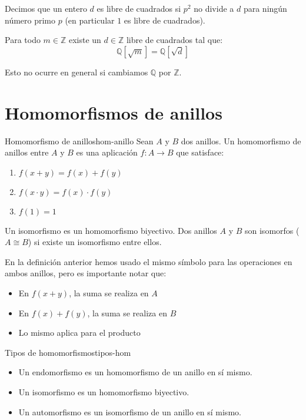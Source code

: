 \begin{example}{}{}
    Decimos que un entero \(d\) es libre de cuadrados si \(p^2\) no divide a \(d\) para ningún número primo \(p\) (en particular \(1\) es libre de cuadrados).
    
    Para todo \(m \in \mathbb{Z}\) existe un \(d \in \mathbb{Z}\) libre de cuadrados tal que:
    \[
    \mathbb{Q}[\sqrt{m}] = \mathbb{Q}[\sqrt{d}]
    \]
    
    Esto no ocurre en general si cambiamos \(\mathbb{Q}\) por \(\mathbb{Z}\).
\end{example}

\clearpage
\section{Homomorfismos de anillos}

\begin{definition}{Homomorfismo de anillos}{hom-anillo}
    Sean \(A\) y \(B\) dos anillos. Un homomorfismo de anillos entre \(A\) y \(B\) es una aplicación \(f: A \to B\) que satisface:
    \begin{enumerate}
        \item \(f(x + y) = f(x) + f(y)\)
        \item \(f(x \cdot y) = f(x) \cdot f(y)\)
        \item \(f(1) = 1\)
    \end{enumerate}
    
    Un isomorfismo es un homomorfismo biyectivo. Dos anillos \(A\) y \(B\) son isomorfos (\(A \cong B\)) si existe un isomorfismo entre ellos.
\end{definition}

\begin{remark}
    En la definición anterior hemos usado el mismo símbolo para las operaciones en ambos anillos, pero es importante notar que:
    \begin{itemize}
        \item En \(f(x + y)\), la suma se realiza en \(A\)
        \item En \(f(x) + f(y)\), la suma se realiza en \(B\)
        \item Lo mismo aplica para el producto
    \end{itemize}
\end{remark}

\begin{definition}{Tipos de homomorfismos}{tipos-hom}
    \begin{itemize}
        \item Un {endomorfismo} es un homomorfismo de un anillo en sí mismo.
        \item Un {isomorfismo} es un homomorfismo biyectivo.
        \item Un {automorfismo} es un isomorfismo de un anillo en sí mismo.
    \end{itemize}
\end{definition}

